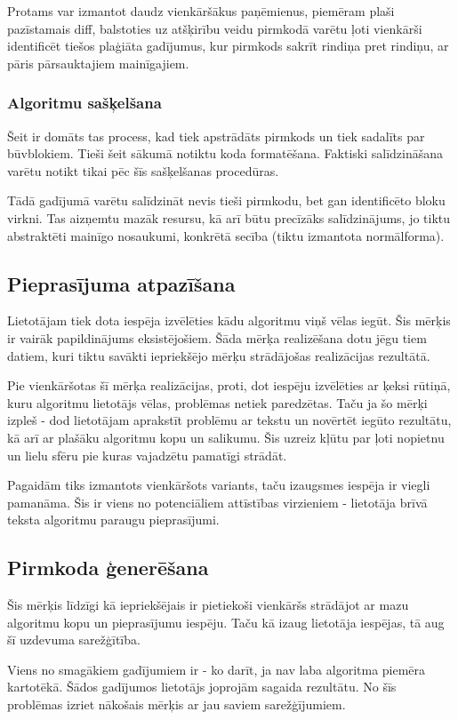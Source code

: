 Protams var izmantot daudz vienkāršākus paņēmienus, piemēram plaši pazīstamais diff, balstoties uz atšķirību veidu pirmkodā varētu ļoti vienkārši identificēt tiešos plaģiāta gadījumus, kur pirmkods sakrīt rindiņa pret rindiņu, ar pāris pārsauktajiem mainīgajiem.

\subsubsection{Algoritmu sašķelšana}
Šeit ir domāts tas process, kad tiek apstrādāts pirmkods un tiek sadalīts par būvblokiem. Tieši šeit sākumā notiktu koda formatēšana. Faktiski salīdzināšana varētu notikt tikai pēc šīs sašķelšanas procedūras.

Tādā gadījumā varētu salīdzināt nevis tieši pirmkodu, bet gan identificēto bloku virkni. Tas aizņemtu mazāk resursu, kā arī būtu precīzāks salīdzinājums, jo tiktu abstraktēti mainīgo nosaukumi, konkrētā secība (tiktu izmantota normālforma).

\subsection{Pieprasījuma atpazīšana}
Lietotājam tiek dota iespēja izvēlēties kādu algoritmu viņš vēlas iegūt. Šis mērķis ir vairāk papildinājums eksistējošiem. Šāda mērķa realizēšana dotu jēgu tiem datiem, kuri tiktu savākti iepriekšējo mērķu strādājošas realizācijas rezultātā. 

Pie vienkāršotas šī mērķa realizācijas, proti, dot iespēju izvēlēties ar ķeksi rūtiņā, kuru algoritmu lietotājs vēlas, problēmas netiek paredzētas. Taču ja šo mērķi izpleš - dod lietotājam aprakstīt problēmu ar tekstu un novērtēt iegūto rezultātu, kā arī ar plašāku algoritmu kopu un salikumu. Šis uzreiz kļūtu par ļoti nopietnu un lielu sfēru pie kuras vajadzētu pamatīgi strādāt.

Pagaidām tiks izmantots vienkāršots variants, taču izaugsmes iespēja ir viegli pamanāma. Šis ir viens no potenciāliem attīstības virzieniem - lietotāja brīvā teksta algoritmu paraugu pieprasījumi.

\subsection{Pirmkoda ģenerēšana}
Šis mērķis līdzīgi kā iepriekšējais ir pietiekoši vienkāršs strādājot ar mazu algoritmu kopu un pieprasījumu iespēju. Taču kā izaug lietotāja iespējas, tā aug šī uzdevuma sarežģītība.

Viens no smagākiem gadījumiem ir - ko darīt, ja nav laba algoritma piemēra kartotēkā. Šādos gadījumos lietotājs joprojām sagaida rezultātu. No šīs problēmas izriet nākošais mērķis ar jau saviem sarežģījumiem.

